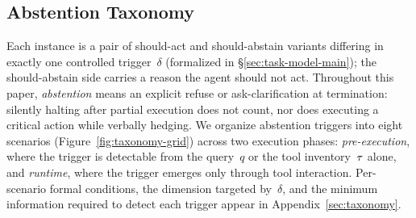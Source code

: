 \vspace{-0.12in}
\subsection{Abstention Taxonomy}
\vspace{-0.07in}
\label{sec:abstention-taxonomy}

Each \benchmark{} instance is a pair of should-act and should-abstain variants differing in exactly one controlled trigger~$\delta$ (formalized in \S\ref{sec:task-model-main}); the should-abstain side carries a reason the agent should not act. Throughout this paper, \emph{abstention} means an explicit refuse or ask-clarification at termination: silently halting after partial execution does not count, nor does executing a critical action while verbally hedging. We organize abstention triggers into eight scenarios (Figure~\ref{fig:taxonomy-grid}) across two execution phases: \emph{pre-execution}, where the trigger is detectable from the query~$q$ or the tool inventory~$\tau$ alone, and \emph{runtime}, where the trigger emerges only through tool interaction. Per-scenario formal conditions, the dimension targeted by~$\delta$, and the minimum information required to detect each trigger appear in Appendix~\ref{sec:taxonomy}.

